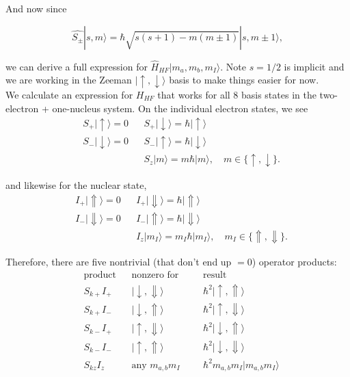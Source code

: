 \documentclass[svgnames]{article}
\begin{document}
And now since 

\[
\hat{S_\pm}|s, m\rangle = \hbar \sqrt{s(s+1) - m(m\pm 1)} |s, m\pm 1\rangle, 
\] \vspace{3px}

we can derive a full expression for $\hat{H}_{HF}|m_a, m_b, m_I\rangle$. Note
$s=1/2$ is implicit and we are working in the Zeeman $|\uparrow,
\downarrow\rangle$ basis to make things easier for now. \\ 

We calculate an expression for $H_{HF}$ that works for all 8 basis states in the
two-electron + one-nucleus system. On the individual electron states, we see 
\begin{align*}
  & S_+|\uparrow\rangle = 0 &&S_+ |\downarrow\rangle = \hbar|\uparrow\rangle \\ 
  & S_-|\downarrow\rangle = 0 &&S_- |\uparrow\rangle = \hbar|\downarrow\rangle
  \\ & &&S_z|m\rangle = m\hbar|m\rangle, \quad m\in\{\uparrow, \downarrow\} . 
\end{align*}

and likewise for the nuclear state, 
\begin{align*}
  & I_+|\Uparrow\rangle = 0 &&I_+ |\Downarrow\rangle = \hbar|\Uparrow\rangle \\ 
  & I_-|\Downarrow\rangle = 0 &&I_- |\Uparrow\rangle = \hbar|\Downarrow\rangle
  \\ & &&I_z|m_I\rangle = m_I\hbar|m_I\rangle, \quad m_I\in\{\Uparrow, \Downarrow\} . 
\end{align*}

Therefore, there are five nontrivial (that don't end up $=0$) operator products: 
\begin{align*}
    &\text{product} &&\text{nonzero for} &&&\text{result} \\  
    &S_{k+}I_+ &&|\downarrow, \Downarrow\rangle &&&\hbar^2|\uparrow,
    \Uparrow\rangle \\ 
    &S_{k+}I_- &&|\downarrow, \Uparrow\rangle &&&\hbar^2|\uparrow,
    \Downarrow\rangle \\ 
    &S_{k-}I_+ &&|\uparrow, \Downarrow\rangle &&&\hbar^2|\downarrow,
    \Uparrow\rangle \\ 
    &S_{k-}I_{-} &&|\uparrow, \Uparrow\rangle &&&\hbar^2|\downarrow,
    \Downarrow\rangle \\ 
    &S_{kz}I_z &&\text{any } m_{a,b}m_I &&& \hbar^2m_{a, b}m_I|m_{a,b}m_I\rangle  
\end{align*}
\end{document}
